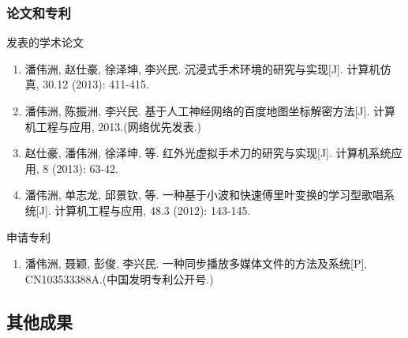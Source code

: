 \documentclass[xcolor=svgnames,serif,table,10pt]{beamer}
\begin{document}
\begin{frame}
  \frametitle{论文和专利}
  \begin{block}{发表的学术论文}
    \scriptsize\sffamily
    \begin{enumerate}
  \item {\normalfont 潘伟洲}, 赵仕豪, 徐泽坤, 李兴民. 沉浸式手术环境的研究与实现[J]. 计算机仿真,
  30.12 (2013): 411-415.\pause
  \item {\normalfont 潘伟洲}, 陈振洲, 李兴民. 基于人工神经网络的百度地图坐标解密方法[J].
    计算机工程与应用, 2013.(网络优先发表.)\pause
  \item 赵仕豪, {\normalfont 潘伟洲}, 徐泽坤, 等. 红外光虚拟手术刀的研究与实现[J]. 计算机系统应用,
    8 (2013): 63-42.\pause
  \item {\normalfont 潘伟洲}, 单志龙, 邱景钦, 等. 一种基于小波和快速傅里叶变换的学习型歌唱系统[J].
    计算机工程与应用, 48.3 (2012): 143-145.
  \end{enumerate}
\end{block}
\pause
\begin{block}{申请专利}
  \scriptsize\sffamily
  \begin{enumerate}
  \item {\normalfont 潘伟洲}, 聂颖, 彭俊, 李兴民. 一种同步播放多媒体文件的方法及系统[P], CN103533388A.(中国发明专利公开号.)
  \end{enumerate}
\end{block}
\end{frame}

\subsection{其他成果}
\end{document}
